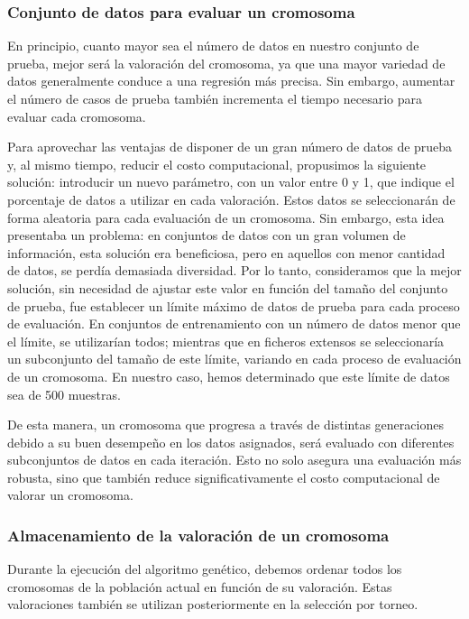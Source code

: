 \documentclass[conference,a4paper]{IEEEtran}
\begin{document}
\subsubsection{Conjunto de datos para evaluar un cromosoma}

En principio, cuanto mayor sea el número de datos en nuestro conjunto de prueba, mejor será la valoración del cromosoma, ya que una mayor variedad de datos generalmente conduce a una regresión más precisa. Sin embargo, aumentar el número de casos de prueba también incrementa el tiempo necesario para evaluar cada cromosoma.

Para aprovechar las ventajas de disponer de un gran número de datos de prueba y, al mismo tiempo, reducir el costo computacional, propusimos la siguiente solución: introducir un nuevo parámetro, con un valor entre 0 y 1, que indique el porcentaje de datos a utilizar en cada valoración. Estos datos se seleccionarán de forma aleatoria para cada evaluación de un cromosoma. Sin embargo, esta idea presentaba un problema: en conjuntos de datos con un gran volumen de información, esta solución era beneficiosa, pero en aquellos con menor cantidad de datos, se perdía demasiada diversidad. Por lo tanto, consideramos que la mejor solución, sin necesidad de ajustar este valor en función del tamaño del conjunto de prueba, fue establecer un límite máximo de datos de prueba para cada proceso de evaluación. En conjuntos de entrenamiento con un número de datos menor que el límite, se utilizarían todos; mientras que en ficheros extensos se seleccionaría un subconjunto del tamaño de este límite, variando en cada proceso de evaluación de un cromosoma. En nuestro caso, hemos determinado que este límite de datos sea de 500 muestras.

De esta manera, un cromosoma que progresa a través de distintas generaciones debido a su buen desempeño en los datos asignados, será evaluado con diferentes subconjuntos de datos en cada iteración. Esto no solo asegura una evaluación más robusta, sino que también reduce significativamente el costo computacional de valorar un cromosoma.


\subsubsection{Almacenamiento de la valoración de un cromosoma}
Durante la ejecución del algoritmo genético, debemos ordenar todos los cromosomas de la población actual en función de su valoración. Estas valoraciones también se utilizan posteriormente en la selección por torneo.
\end{document}
